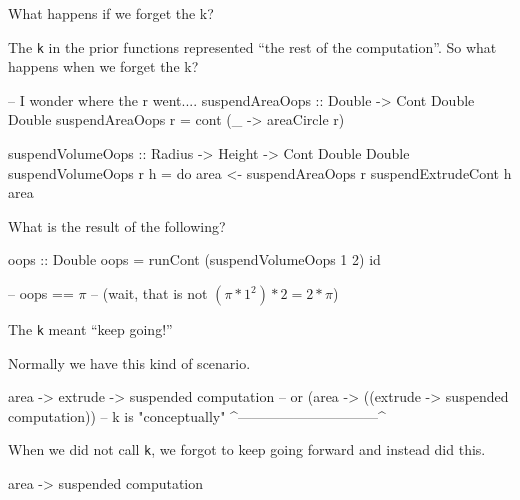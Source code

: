 \documentclass[ignorenonframetext,]{beamer}
\begin{document}
\begin{frame}[fragile]{What happens if we forget the k?}

The \texttt{k} in the prior functions represented ``the rest of the
computation''. So what happens when we forget the k?

\begin{haskellcode}
-- I wonder where the r went....
suspendAreaOops :: Double -> Cont Double Double
suspendAreaOops r = cont (\_ -> areaCircle r)

suspendVolumeOops :: Radius -> Height -> Cont Double Double
suspendVolumeOops r h = do
  area <- suspendAreaOops r
  suspendExtrudeCont h area
\end{haskellcode}

What is the result of the following?

\begin{haskellcode}
oops :: Double
oops = runCont (suspendVolumeOops 1 2) id
\end{haskellcode}

\pause

\begin{haskellcode}
-- oops == $\pi$
-- (wait, that is not $(\pi * 1^2) * 2 = 2*\pi$)
\end{haskellcode}

\end{frame}

\begin{frame}[fragile]{The \texttt{k} meant ``keep going!''}

Normally we have this kind of scenario.

\begin{haskellcode}
area -> extrude -> suspended computation
--        or (area -> ((extrude -> suspended computation))
--  k is "conceptually" ^------------------------------^
\end{haskellcode}

When we did not call \texttt{k}, we forgot to keep going forward and
instead did this.

\begin{haskellcode}
area -> suspended computation
\end{haskellcode}

\end{frame}
\end{document}
